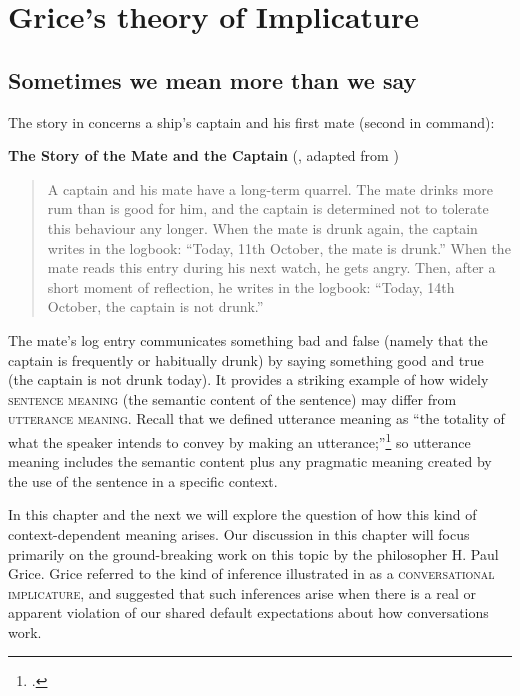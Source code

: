 \chapter{Grice’s theory of Implicature}\label{sec:8}

\section{Sometimes we mean more than we say}\label{sec:8.1}

The story in  concerns a ship’s captain and his first mate (second in command):

\ea \label{ex:8.1}
\textbf{The Story of the Mate and the Captain} (\citealt{Meibauer2005}, adapted from \citealt{Posner1980})\\
\begin{quote}
A captain and his mate have a long-term quarrel. The mate drinks more rum than is good for him, and the captain is determined not to tolerate this behaviour any longer. When the mate is drunk again, the captain writes in the logbook: “Today, 11th October, the mate is drunk.” When the mate reads this entry during his next watch, he gets angry. Then, after a short moment of reflection, he writes in the logbook: “Today, 14th October, the captain is not drunk.”
\end{quote}
\z


The mate’s log entry communicates something bad and false (namely that the captain is frequently or habitually drunk) by saying something good and true (the captain is not drunk today). It provides a striking example of how widely \textsc{sentence meaning} (the semantic content of the sentence) may differ from \textsc{utterance meaning}. Recall that we defined utterance meaning as “the totality of what the speaker intends to convey by making an utterance;”\footnote{\citet[27]{Cruse2000}.} so utterance meaning includes the semantic content plus any pragmatic meaning created by the use of the sentence in a specific context.



In this chapter and the next we will explore the question of how this kind of context-dependent meaning arises. Our discussion in this chapter will focus primarily on the ground-breaking work on this topic by the philosopher H. Paul Grice. Grice referred to the kind of inference illustrated in  as a \textsc{conversational implicature}, and suggested that such inferences arise when there is a real or apparent violation of our shared default expectations about how conversations work.



